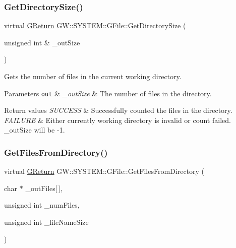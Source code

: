 \subsubsection{\texorpdfstring{Get\+Directory\+Size()}{GetDirectorySize()}}
{\footnotesize\ttfamily virtual \hyperlink{namespaceGW_a67a839e3df7ea8a5c5686613a7a3de21}{G\+Return} G\+W\+::\+S\+Y\+S\+T\+E\+M\+::\+G\+File\+::\+Get\+Directory\+Size (\begin{DoxyParamCaption}\item[{unsigned int \&}]{\+\_\+out\+Size }\end{DoxyParamCaption})\hspace{0.3cm}{\ttfamily [pure virtual]}}



Gets the number of files in the current working directory. 


\begin{DoxyParams}[1]{Parameters}
\mbox{\tt out}  & {\em \+\_\+out\+Size} & The number of files in the directory.\\
\hline
\end{DoxyParams}

\begin{DoxyRetVals}{Return values}
{\em S\+U\+C\+C\+E\+SS} & Successfully counted the files in the directory. \\
\hline
{\em F\+A\+I\+L\+U\+RE} & Either currently working directory is invalid or count failed. \+\_\+out\+Size will be -\/1. \\
\hline
\end{DoxyRetVals}
\mbox{\label{classGW_1_1SYSTEM_1_1GFile_ae062d19f84d120adea94756d1d26e41e}} 
\subsubsection{\texorpdfstring{Get\+Files\+From\+Directory()}{GetFilesFromDirectory()}}
{\footnotesize\ttfamily virtual \hyperlink{namespaceGW_a67a839e3df7ea8a5c5686613a7a3de21}{G\+Return} G\+W\+::\+S\+Y\+S\+T\+E\+M\+::\+G\+File\+::\+Get\+Files\+From\+Directory (\begin{DoxyParamCaption}\item[{char $\ast$}]{\+\_\+out\+Files\mbox{[}$\,$\mbox{]},  }\item[{unsigned int}]{\+\_\+num\+Files,  }\item[{unsigned int}]{\+\_\+file\+Name\+Size }\end{DoxyParamCaption})\hspace{0.3cm}{\ttfamily [pure virtual]}}



